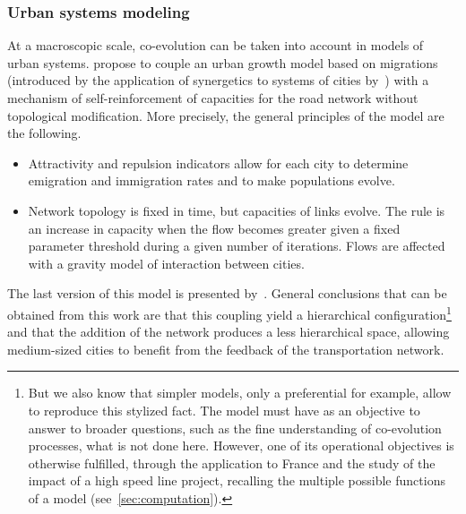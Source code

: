 \subsubsection{Urban systems modeling}

At a macroscopic scale, co-evolution can be taken into account in models of urban systems. \cite{baptiste1999interactions} propose to couple an urban growth model based on migrations (introduced by the application of synergetics to systems of cities by~\cite{sanders1992systeme}) with a mechanism of self-reinforcement of capacities for the road network without topological modification. More precisely, the general principles of the model are the following.
\begin{itemize}
\item Attractivity and repulsion indicators allow for each city to determine emigration and immigration rates and to make populations evolve.
\item Network topology is fixed in time, but capacities of links evolve. The rule is an increase in capacity when the flow becomes greater given a fixed parameter threshold during a given number of iterations. Flows are affected with a gravity model of interaction between cities.
\end{itemize}


The last version of this model is presented by~\cite{baptistemodeling}. General conclusions that can be obtained from this work are that this coupling yield a hierarchical configuration\footnote{But we also know that simpler models, only a preferential for example, allow to reproduce this stylized fact. The model must have as an objective to answer to broader questions, such as the fine understanding of co-evolution processes, what is not done here. However, one of its operational objectives is otherwise fulfilled, through the application to France and the study of the impact of a high speed line project, recalling the multiple possible functions of a model (see~\ref{sec:computation}).} and that the addition of the network produces a less hierarchical space, allowing medium-sized cities to benefit from the feedback of the transportation network.


